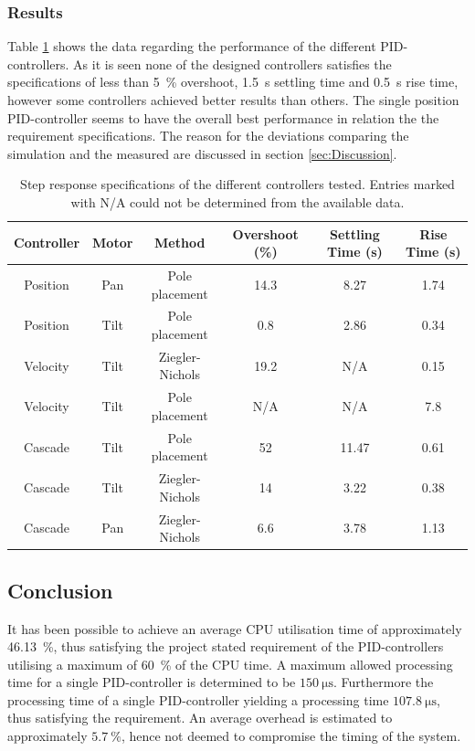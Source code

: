 \documentclass[../../main.tex]{subfiles}
\begin{document}
\subsubsection*{Results}
Table \ref{tab:controller_data} shows the data regarding the performance of the different PID-controllers. As it is seen none of the designed controllers satisfies the specifications of less than \SI{5}{\percent} overshoot, \SI{1,5}{\second} settling time and \SI{0,5}{\second} rise time, however some controllers achieved better results than others. The single position PID-controller seems to have the overall best performance in relation the the requirement specifications. The reason for the deviations comparing the simulation and the measured are discussed in section \ref{sec:Discussion}.
\begin{table}[H]
    \centering
    \begin{tabular}{c|c|c|c|c|c}
         Controller & Motor & Method & Overshoot (\%) & Settling Time (s)  & Rise Time (s) \\ \hline
         Position & Pan & Pole placement & 14.3 & 8.27 & 1.74  \\
         Position & Tilt & Pole placement & 0.8 & 2.86 & 0.34  \\
         Velocity & Tilt & Ziegler-Nichols & 19.2 & N/A & 0.15  \\
         Velocity &Tilt & Pole placement & N/A & N/A & 7.8 \\
         Cascade & Tilt  & Pole placement & 52 & 11.47 & 0.61 \\
         Cascade & Tilt & Ziegler-Nichols & 14 & 3.22 & 0.38  \\
         Cascade & Pan & Ziegler-Nichols & 6.6 & 3.78 & 1.13  \\
         
    \end{tabular}
    \caption{Step response specifications of the different controllers tested. Entries marked with N/A could not be determined from the available data.}
    \label{tab:controller_data}
\end{table}

\subsection{Conclusion}
It has been possible to achieve an average CPU utilisation time of approximately \SI{46,13}{\percent}, thus satisfying the project stated requirement of the PID-controllers utilising a maximum of \SI{60}{\percent} of the CPU time. A maximum allowed processing time for a single PID-controller is determined to be $\SI{150}{\micro \second}$. Furthermore the processing time of a single PID-controller yielding a processing time $\SI{107,8}{\micro \second}$, thus satisfying the requirement. An average overhead is estimated to approximately $\SI{5,7}{\percent}$, hence not deemed to compromise the timing of the system.
\end{document}
